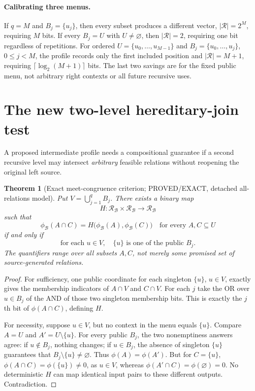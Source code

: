 \documentclass[11pt]{article}
\newtheorem{theorem}{Theorem}
\begin{document}
\paragraph{Calibrating three menus.}
If \(q=M\) and \(B_j=\{u_j\}\), then every subset produces a
different vector, \(|\mathcal R|=2^M\), requiring \(M\) bits.
If every \(B_j=U\) with \(U\ne\varnothing\), then
\(|\mathcal R|=2\), requiring one bit regardless of repetitions.
For ordered \(U=\{u_0,\ldots,u_{M-1}\}\) and
\(B_j=\{u_0,\ldots,u_j\}\), \(0\le j<M\), the profile records
only the first included position and
\(|\mathcal R|=M+1\), requiring
\(\lceil\log_2(M+1)\rceil\) bits.
The last two savings are for the fixed public menu, not arbitrary
right contexts or all future recursive uses.

\section{The new two-level hereditary-join test}
A proposed intermediate profile needs a compositional guarantee if a
second recursive level may intersect \emph{arbitrary} feasible relations
without reopening the original left source.

\begin{theorem}[Exact meet-congruence criterion; PROVED/EXACT,
detached all-relations model]\label{thm:meet}
Put \(V=\bigcup_{j=1}^q B_j\). There exists a binary map
\[
 H:\mathcal R_{\mathcal B}\times\mathcal R_{\mathcal B}
 \longrightarrow\mathcal R_{\mathcal B}
\]
such that
\[
 \boxed{\qquad
 \phi_{\mathcal B}(A\cap C)=
 H\bigl(\phi_{\mathcal B}(A),\phi_{\mathcal B}(C)\bigr)
 \quad\text{for every } A,C\subseteq U
 \qquad}
\]
\emph{if and only if}
\[
 \boxed{\qquad
 \text{for each }u\in V,\quad
 \{u\}\text{ is one of the public }B_j .
 \qquad}
\]
The quantifiers range over \emph{all} subsets \(A,C\), not merely
some promised set of source-generated relations.
\end{theorem}
\begin{proof}
For sufficiency, one public coordinate for each singleton
\(\{u\}\), \(u\in V\), exactly gives the membership indicators of
\(A\cap V\) and \(C\cap V\).
For each \(j\) take the OR over \(u\in B_j\) of the AND of those
two singleton membership bits. This is exactly the \(j\)th bit of
\(\phi(A\cap C)\), defining \(H\).

For necessity, suppose \(u\in V\), but no context in the menu
equals \(\{u\}\). Compare \(A=U\) and
\(A'=U\setminus\{u\}\). For every public \(B_j\), the two
nonemptiness answers agree: if \(u\notin B_j\), nothing changes;
if \(u\in B_j\), the absence of singleton \(\{u\}\) guarantees
that \(B_j\setminus\{u\}\ne\varnothing\).
Thus \(\phi(A)=\phi(A')\). But for \(C=\{u\}\),
\(\phi(A\cap C)=\phi(\{u\})\ne 0\), as \(u\in V\), whereas
\(\phi(A'\cap C)=\phi(\varnothing)=0\).
No deterministic \(H\) can map identical input pairs to these
different outputs. Contradiction.
\end{proof}
\end{document}
